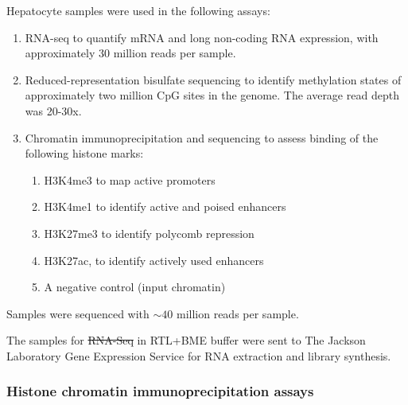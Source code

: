 \documentclass[
  11pt,
]{article}
\providecommand{\tightlist}{%
  \setlength{\itemsep}{0pt}\setlength{\parskip}{0pt}}
\providecommand{\DIFaddtex}[1]{{\protect\color{blue}\uwave{#1}}} %
\providecommand{\DIFdeltex}[1]{{\protect\color{red}\sout{#1}}}                      %
\providecommand{\DIFaddbegin}{} %
\providecommand{\DIFaddend}{} %
\providecommand{\DIFdelbegin}{} %
\providecommand{\DIFdelend}{} %
\providecommand{\DIFadd}[1]{\texorpdfstring{\DIFaddtex{#1}}{#1}} %
\providecommand{\DIFdel}[1]{\texorpdfstring{\DIFdeltex{#1}}{}} %
\newcommand{\DIFscaledelfig}{0.5}
\newlength{\DIFdelgraphicswidth} %
\newlength{\DIFdelgraphicsheight} %
\newcommand{\DIFaddincludegraphics}[2][]{{\color{blue}\fbox{\DIFOincludegraphics[#1]{#2}}}} %
\newcommand{\DIFdelincludegraphics}[2][]{%
\sbox{\DIFdelgraphicsbox}{\DIFOincludegraphics[#1]{#2}}%
\settoboxwidth{\DIFdelgraphicswidth}{\DIFdelgraphicsbox} %
\settoboxtotalheight{\DIFdelgraphicsheight}{\DIFdelgraphicsbox} %
\scalebox{\DIFscaledelfig}{%
\parbox[b]{\DIFdelgraphicswidth}{\usebox{\DIFdelgraphicsbox}\\[-\baselineskip] \rule{\DIFdelgraphicswidth}{0em}}\llap{\resizebox{\DIFdelgraphicswidth}{\DIFdelgraphicsheight}{%
\setlength{\unitlength}{\DIFdelgraphicswidth}%
\begin{picture}(1,1)%
\thicklines\linethickness{2pt} %
{\color[rgb]{1,0,0}\put(0,0){\framebox(1,1){}}}%
{\color[rgb]{1,0,0}\put(0,0){\line( 1,1){1}}}%
{\color[rgb]{1,0,0}\put(0,1){\line(1,-1){1}}}%
\end{picture}%
}\hspace*{3pt}}} %
} %
\DeclareRobustCommand{\DIFaddbegin}{\DIFOaddbegin \let\includegraphics\DIFaddincludegraphics} %
\DeclareRobustCommand{\DIFaddend}{\DIFOaddend \let\includegraphics\DIFOincludegraphics} %
\DeclareRobustCommand{\DIFdelbegin}{\DIFOdelbegin \let\includegraphics\DIFdelincludegraphics} %
\DeclareRobustCommand{\DIFdelend}{\DIFOaddend \let\includegraphics\DIFOincludegraphics} %
\begin{document}
Hepatocyte samples were used in the following assays:

\begin{enumerate}
\def\labelenumi{\arabic{enumi}.}
\tightlist
\item
  RNA-seq to quantify mRNA and long non-coding RNA expression, with
  approximately 30 million reads per sample.
\item
  Reduced-representation bisulfate sequencing to identify methylation
  states of approximately two million CpG sites in the genome. The
  average read depth was 20-30x.
\item
  Chromatin immunoprecipitation and sequencing to assess binding of the
  following histone marks:

  \begin{enumerate}
  \def\labelenumii{\alph{enumii}.}
  \tightlist
  \item
    H3K4me3 to map active promoters
  \item
    H3K4me1 to identify active and poised enhancers
  \item
    H3K27me3 to identify polycomb repression
  \item
    H3K27ac, to identify actively used enhancers
  \item
    A negative control (input chromatin)
  \end{enumerate}
\end{enumerate}

Samples were sequenced with \(\sim40\) million reads per sample.

The samples for \DIFdelbegin \DIFdel{RNA-Seq }\DIFdelend \DIFaddbegin \DIFadd{RNA-seq }\DIFaddend in RTL+BME buffer were sent to The Jackson
Laboratory Gene Expression Service for RNA extraction and library
synthesis.

\hypertarget{histone-chromatin-immunoprecipitation-assays}{%
\subsubsection{Histone chromatin immunoprecipitation
assays}\label{histone-chromatin-immunoprecipitation-assays}}
\end{document}
